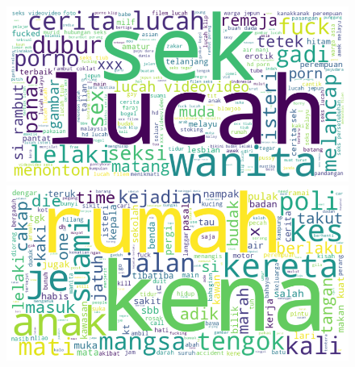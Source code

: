 \documentclass[preprint]{article}
\begin{document}
\begin{figure}[h]
  \centering
  \begin{minipage}[b]{0.45\textwidth}
    \centering
    \includegraphics[width=\linewidth]{img/porn-wordcloud.png}
  \end{minipage}
  \hfill
  \begin{minipage}[b]{0.45\textwidth}
    \centering
    \includegraphics[width=\linewidth]{img/violence-wordcloud.png}
  \end{minipage}
\end{figure}
\end{document}
